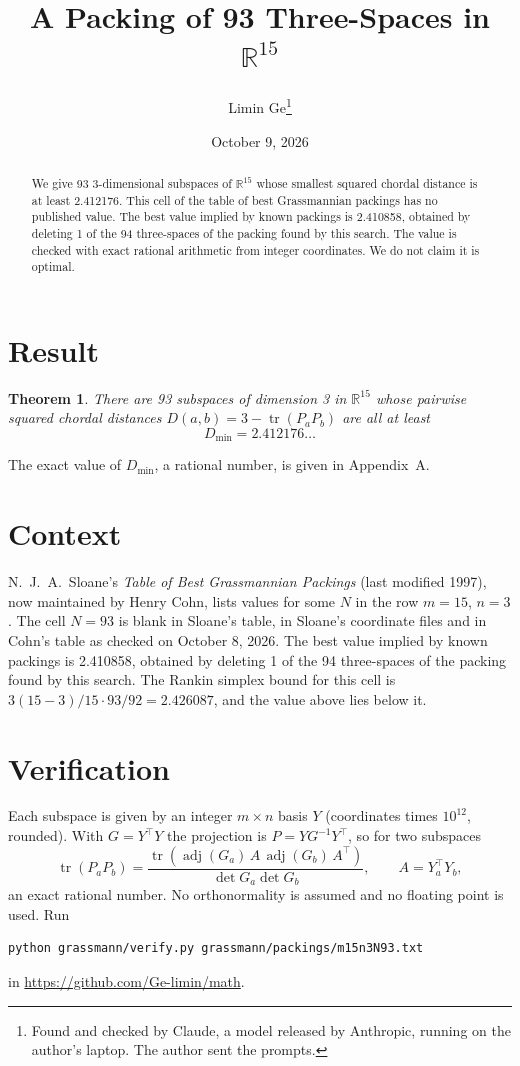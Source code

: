 \documentclass[11pt,a4paper]{article}
\title{A Packing of 93 Three-Spaces in $\mathbb{R}^{15}$}
\author{Limin Ge\thanks{Found and checked by Claude, a model released by Anthropic, running on the author's laptop. The author sent the prompts.}}
\date{October 9, 2026}
\newtheorem*{theorem}{Theorem}
\begin{document}
\maketitle
\begin{abstract}
We give 93 3-dimensional subspaces of $\mathbb{R}^{15}$ whose smallest squared chordal distance is at least 2.412176. This cell of the table of best Grassmannian packings has no published value. The best value implied by known packings is 2.410858, obtained by deleting 1 of the 94 three-spaces of the packing found by this search. The value is checked with exact rational arithmetic from integer coordinates. We do not claim it is optimal.
\end{abstract}

\section{Result}
\begin{theorem}
There are 93 subspaces of dimension 3 in $\mathbb{R}^{15}$ whose pairwise squared chordal distances $D(a,b) = 3 - \operatorname{tr}(P_aP_b)$ are all at least
\[ D_{\min} = 2.412176\ldots \]
\end{theorem}
The exact value of $D_{\min}$, a rational number, is given in Appendix~A.


\section{Context}
N.~J.~A.~Sloane's \emph{Table of Best Grassmannian Packings} (last modified 1997), now maintained by Henry Cohn, lists values for some $N$ in the row $m=15$, $n=3$. The cell $N=93$ is blank in Sloane's table, in Sloane's coordinate files and in Cohn's table as checked on October 8, 2026. The best value implied by known packings is 2.410858, obtained by deleting 1 of the 94 three-spaces of the packing found by this search. The Rankin simplex bound for this cell is $3(15-3)/15\cdot 93/92 = 2.426087$, and the value above lies below it.


\section{Verification}
Each subspace is given by an integer $m\times n$ basis $Y$ (coordinates times $10^{12}$, rounded). With $G=Y^\top Y$ the projection is $P=YG^{-1}Y^\top$, so for two subspaces
\[ \operatorname{tr}(P_aP_b)=\frac{\operatorname{tr}(\operatorname{adj}(G_a)\,A\,\operatorname{adj}(G_b)\,A^\top)}{\det G_a\det G_b},\qquad A=Y_a^\top Y_b, \]
an exact rational number. No orthonormality is assumed and no floating point is used. Run
\begin{verbatim}
python grassmann/verify.py grassmann/packings/m15n3N93.txt
\end{verbatim}
in \url{https://github.com/Ge-limin/math}.
\end{document}
